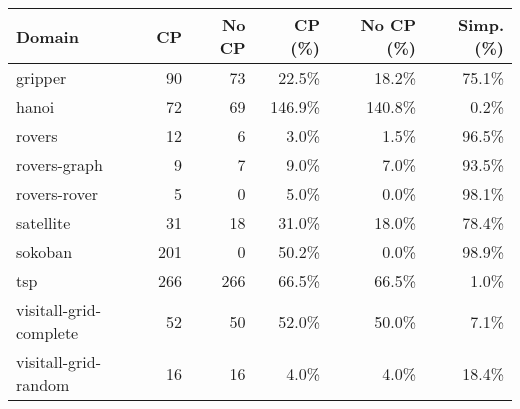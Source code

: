 \begin{tabular}{l|rr|rr|r}
	\toprule
	Domain & CP & No CP & CP (\%) & No CP (\%) & Simp. (\%) \\ 
	\midrule 
	gripper & 90 & 73 & 22.5\% & 18.2\% & 75.1\% \\ 
	hanoi & 72 & 69 & 146.9\% & 140.8\% & 0.2\% \\ 
	rovers & 12 & 6 & 3.0\% & 1.5\% & 96.5\% \\ 
	rovers-graph & 9 & 7 & 9.0\% & 7.0\% & 93.5\% \\ 
	rovers-rover & 5 & 0 & 5.0\% & 0.0\% & 98.1\% \\ 
	satellite & 31 & 18 & 31.0\% & 18.0\% & 78.4\% \\ 
	sokoban & 201 & 0 & 50.2\% & 0.0\% & 98.9\% \\ 
	tsp & 266 & 266 & 66.5\% & 66.5\% & 1.0\% \\ 
	visitall-grid-complete & 52 & 50 & 52.0\% & 50.0\% & 7.1\% \\ 
	visitall-grid-random & 16 & 16 & 4.0\% & 4.0\% & 18.4\% \\ 
	\bottomrule
\end{tabular}